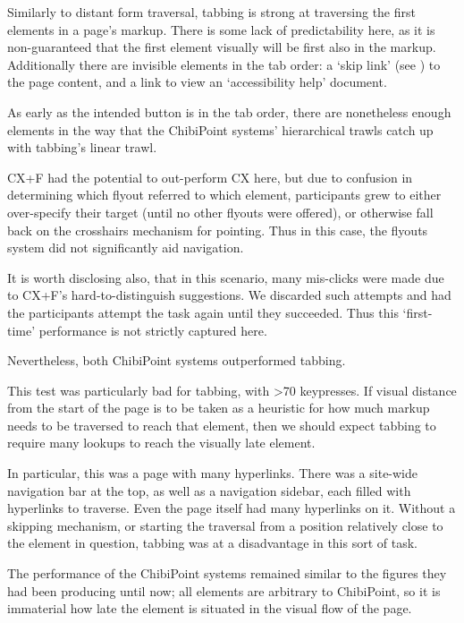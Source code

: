\documentclass[a4paper, 12pt]{report}
\begin{document}
Similarly to distant form traversal, tabbing is strong at traversing the first elements in a page's markup. There is some lack of predictability here, as it is non-guaranteed that the first element visually will be first also in the markup. Additionally there are invisible elements in the tab order: a `skip link' (see ) to the page content, and a link to view an `accessibility help' document.

As early as the intended button is in the tab order, there are nonetheless enough elements in the way that the ChibiPoint systems' hierarchical trawls catch up with tabbing's linear trawl.

CX+F had the potential to out-perform CX here, but due to confusion in determining which flyout referred to which element, participants grew to either over-specify their target (until no other flyouts were offered), or otherwise fall back on the crosshairs mechanism for pointing. Thus in this case, the flyouts system did not significantly aid navigation.

It is worth disclosing also, that in this scenario, many mis-clicks were made due to CX+F's hard-to-distinguish suggestions. We discarded such attempts and had the participants attempt the task again until they succeeded. Thus this `first-time' performance is not strictly captured here.

Nevertheless, both ChibiPoint systems outperformed tabbing.

This test was particularly bad for tabbing, with >70 keypresses. If visual distance from the start of the page is to be taken as a heuristic for how much markup needs to be traversed to reach that element, then we should expect tabbing to require many lookups to reach the visually late element.

In particular, this was a page with many hyperlinks. There was a site-wide navigation bar at the top, as well as a navigation sidebar, each filled with hyperlinks to traverse. Even the page itself had many hyperlinks on it. Without a skipping mechanism, or starting the traversal from a position relatively close to the element in question, tabbing was at a disadvantage in this sort of task.

The performance of the ChibiPoint systems remained similar to the figures they had been producing until now; all elements are arbitrary to ChibiPoint, so it is immaterial how late the element is situated in the visual flow of the page.
\end{document}
